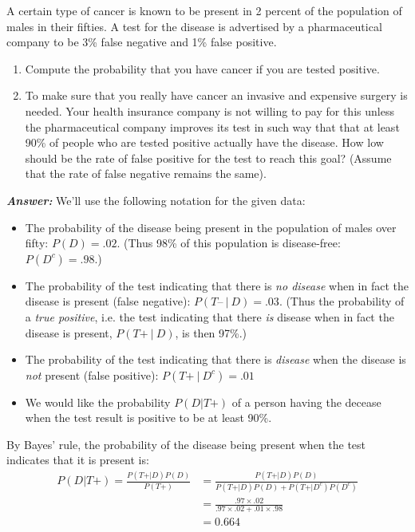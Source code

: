 \documentclass[12pt]{article}
\newenvironment{question}[2][Question]{\begin{trivlist}
\item[\hskip \labelsep {\bfseries #1}\hskip \labelsep {\bfseries #2.}]}{\end{trivlist}}
\begin{document}
\bigskip
\bigskip
\begin{question}{2.2} A certain type of cancer is known to be present in 2 percent of the population of males in their fifties.
A test for the disease is advertised by a pharmaceutical company to be 3\% false negative and 1\% false positive.
\begin{enumerate}
\item{ Compute the probability that you have cancer if you are tested positive.}
\item{To make sure that you really have cancer an invasive and expensive surgery is needed. Your health insurance company is not willing to pay for this unless the pharmaceutical company improves its test in such way that that at least 90\% of people who are tested positive actually have the disease. How low should be the rate of false positive for the test to reach this goal? (Assume that the rate of false negative remains the same).}
\end{enumerate}

\end{question}

 \textbf{\emph{Answer:} } 
 We'll use the following notation for the given data:
 \begin{itemize}
   \item The probability of the disease being present in the population of males over fifty: $P(D) = .02$. (Thus 98\% of this population is disease-free: $P(D^c) = .98$.)
  \item The probability of the test indicating that there is \emph{no disease} when in fact the disease is present (false negative): $P(T\text{--}\ | \ D) = .03$. (Thus the probability of a \emph{true positive}, i.e. the test indicating that there \emph{is} disease when in fact the disease is present, $P(T\text{+}\ | \ D)$, is then 97\%.)
  \item The probability of the test indicating that there is \emph{disease} when the disease is \emph{not} present (false positive): $P(T\text{+}\ | \ D^c) = .01$
  \item We would like the probability $P(D | T\text{+})$ of a person having the decease when the test result is positive to be at least 90\%. 
\end{itemize}

By Bayes' rule, the probability of the disease being present when the test indicates that it is present is:
 \begin{align*}
P(D | T\text{+}) = \frac{P(T\text{+} | D) P(D) } {P(T\text{+} )} 
&= \frac{P(T\text{+} | D) P(D) } {P(T\text{+} | D) P(D) + P(T\text{+} | D^c) P(D^c) } \\
&= \frac{.97 \times .02 } {.97 \times .02 + .01 \times .98} \\
&= 0.664
\end{align*}
\end{document}
